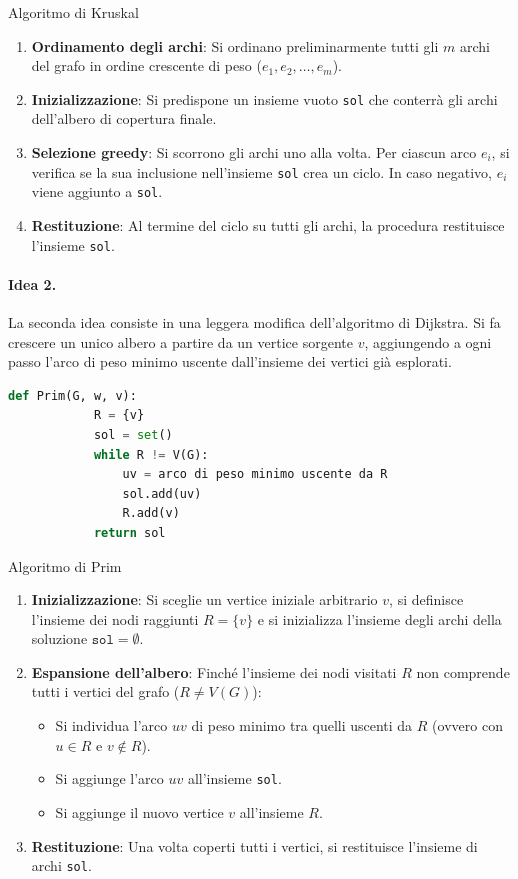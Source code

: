 \documentclass[12pt]{report}
\begin{document}
	\begin{algoritmo}{Algoritmo di Kruskal}{}
		\begin{enumerate}
			\item \textbf{Ordinamento degli archi}: Si ordinano preliminarmente tutti gli $m$ archi del grafo in ordine crescente di peso ($e_1, e_2, \dots, e_m$).
			\item \textbf{Inizializzazione}: Si predispone un insieme vuoto \texttt{sol} che conterrà gli archi dell'albero di copertura finale.
			\item \textbf{Selezione greedy}: Si scorrono gli archi uno alla volta. Per ciascun arco $e_i$, si verifica se la sua inclusione nell'insieme \texttt{sol} crea un ciclo. In caso negativo, $e_i$ viene aggiunto a \texttt{sol}.
			\item \textbf{Restituzione}: Al termine del ciclo su tutti gli archi, la procedura restituisce l'insieme \texttt{sol}.
		\end{enumerate}
	\end{algoritmo}
	
	
	\paragraph{Idea 2.} La seconda idea consiste in una leggera modifica dell'algoritmo di Dijkstra. Si fa crescere un unico albero a partire da un vertice sorgente $v$, aggiungendo a ogni passo l'arco di peso minimo uscente dall'insieme dei vertici già esplorati.
	
	\begin{lstlisting}[language=Python, caption={Algoritmo di Prim}]
		def Prim(G, w, v):
			R = {v}
			sol = set()
			while R != V(G):
				uv = arco di peso minimo uscente da R
				sol.add(uv)
				R.add(v)
			return sol
	\end{lstlisting}
	
	\begin{algoritmo}{Algoritmo di Prim}{}
		\begin{enumerate}
			\item \textbf{Inizializzazione}: Si sceglie un vertice iniziale arbitrario $v$, si definisce l'insieme dei nodi raggiunti $R = \{v\}$ e si inizializza l'insieme degli archi della soluzione $\texttt{sol} = \emptyset$.
			\item \textbf{Espansione dell'albero}: Finché l'insieme dei nodi visitati $R$ non comprende tutti i vertici del grafo ($R \neq V(G)$):
			\begin{itemize}
				\item Si individua l'arco $uv$ di peso minimo tra quelli uscenti da $R$ (ovvero con $u \in R$ e $v \notin R$).
				\item Si aggiunge l'arco $uv$ all'insieme \texttt{sol}.
				\item Si aggiunge il nuovo vertice $v$ all'insieme $R$.
			\end{itemize}
			\item \textbf{Restituzione}: Una volta coperti tutti i vertici, si restituisce l'insieme di archi \texttt{sol}.
		\end{enumerate}
	\end{algoritmo}
	
\end{document}

